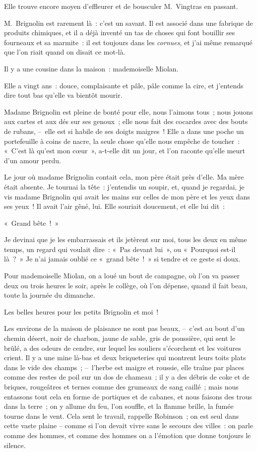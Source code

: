 \documentclass[french,twoside]{book} %
\begin{document}
Elle trouve encore moyen d’effleurer et de bousculer M. Vingtras en passant.\par
\bigbreak
\noindent M. Brignolin est rarement là : c’est un savant. Il est associé dans une fabrique de produits chimiques, et il a déjà inventé un tas de choses qui font bouillir ses fourneaux et sa marmite : il est toujours dans les \emph{cornues}, et j’ai même remarqué que l’on riait quand on disait ce mot-là.\par
\bigbreak
\noindent Il y a une cousine dans la maison : mademoiselle Miolan.\par
Elle a vingt ans : douce, complaisante et pâle, pâle comme la cire, et j’entends dire tout bas qu’elle va bientôt mourir.\par
Madame Brignolin est pleine de bonté pour elle, nous l’aimons tous ; nous jouons aux cartes et aux dés sur ses genoux ; elle nous fait des cocardes avec des bouts de rubans, – elle est si habile de ses doigts maigres ! Elle a dans une poche un portefeuille à coins de nacre, la seule chose qu’elle nous empêche de toucher : « C’est là qu’est mon cœur », a-t-elle dit un jour, et l’on raconte qu’elle meurt d’un amour perdu.\par
Le jour où madame Brignolin contait cela, mon père était près d’elle. Ma mère était absente. Je tournai la tête : j’entendis un soupir, et, quand je regardai, je vis madame Brignolin qui avait les mains sur celles de mon père et les yeux dans ses yeux ! Il avait l’air gêné, lui. Elle souriait doucement, et elle lui dit :\par
« Grand bête ! »\par
Je devinai que je les embarrassais et ils jetèrent sur moi, tous les deux en même temps, un regard qui voulait dire : « Pas devant lui », ou « Pourquoi est-il là ? » Je n’ai jamais oublié ce « grand bête ! » si tendre et ce geste si doux.\par
\bigbreak
\noindent Pour mademoiselle Miolan, on a loué un bout de campagne, où l’on va passer deux ou trois heures le soir, après le collège, où l’on dépense, quand il fait beau, toute la journée du dimanche.\par
Les belles heures pour les petits Brignolin et moi !\par
Les environs de la maison de plaisance ne sont pas beaux, – c’est au bout d’un chemin désert, noir de charbon, jaune de sable, gris de poussière, qui sent le brûlé, a des odeurs de cendre, sur lequel les souliers s’écorchent et les voitures crient. Il y a une mine là-bas et deux briqueteries qui montrent leurs toits plats dans le vide des champs ; – l’herbe est maigre et roussie, elle traîne par places comme des restes de poil sur un dos de chameau ; il y a des débris de coke et de briques, rougeâtres et ternes comme des grumeaux de sang caillé ; mais nous entassons tout cela en forme de portiques et de cabanes, et nous faisons des trous dans la terre ; on y allume du feu, l’on souffle, et la flamme brille, la fumée tourne dans le vent. Cela sent le travail, rappelle Robinson ; on est seul dans cette vaste plaine – comme si l’on devait vivre sans le secours des villes : on parle comme des hommes, et comme des hommes on a l’émotion que donne toujours le silence.\par
\end{document}
